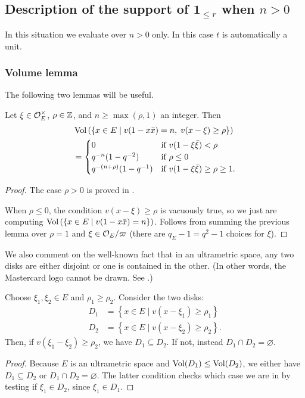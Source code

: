 \subsection{Description of the support of $\mathbf{1}_{\le r}$ when $n > 0$}
In this situation we evaluate over $n > 0$ only.
In this case $t$ is automatically a unit.

\subsubsection{Volume lemma}
The following two lemmas will be useful.

\begin{lemma}
  Let $\xi \in \mathcal O_E^\times$, $\rho \in \mathbb Z$, and $n \ge \max(\rho, 1)$ an integer.
  Then
  \begin{align*}
    &\operatorname{Vol}\left( \left\{ x \in E \mid v(1-x \bar x) = n,
      \; v(x-\xi) \ge \rho \right\} \right) \\
    &=
    \begin{cases}
      0 & \text{if } v(1-\xi\bar\xi) < \rho \\
      q^{-n}(1-q^{-2}) & \text{if } \rho \le 0 \\
      q^{-(n+\rho)}(1-q^{-1}) & \text{if } v(1-\xi\bar\xi) \ge \rho \ge 1.
    \end{cases}
  \end{align*}
  \label{lem:volume}
\end{lemma}
\begin{proof}
  The case $\rho > 0$ is proved in \cite[Lemma 4.4]{ref:AFL}.

  When $\rho \le 0$, the condition $v(x - \xi) \ge \rho$ is vacuously true,
  so we just are computing
  $\operatorname{Vol}\left( \left\{ x \in E \mid v(1-x \bar x) = n \right\} \right)$.
  Follows from summing the previous lemma over $\rho = 1$
  and $\xi \in \mathcal O_E / \varpi$ (there are $q_E-1 = q^2-1$ choices for $\xi$).
\end{proof}

We also comment on the well-known fact that in an ultrametric space,
any two disks are either disjoint or one is contained in the other.
(In other words, the Mastercard logo cannot be drawn. See .)
\begin{proposition}
  Choose $\xi_1, \xi_2 \in E$ and $\rho_1 \geq \rho_2$.
  Consider the two disks:
  \begin{align*}
    D_1 &= \left\{ x \in E \mid v(x-\xi_1) \ge \rho_1 \right\} \\
    D_2 &= \left\{ x \in E \mid v(x-\xi_2) \ge \rho_2 \right\}.
  \end{align*}
  Then, if $v(\xi_1-\xi_2) \geq \rho_2$, we have $D_1 \subseteq D_2$.
  If not, instead $D_1 \cap D_2 = \varnothing$.
  \label{prop:no_mastercard}
\end{proposition}
\begin{proof}
  Because $E$ is an ultrametric space and $\operatorname{Vol}(D_1) \leq \operatorname{Vol}(D_2)$,
  we either have $D_1 \subseteq D_2$ or $D_1 \cap D_2 = \varnothing$.
  The latter condition checks which case we are in by testing if $\xi_1 \in D_2$,
  since $\xi_1 \in D_1$.
\end{proof}

